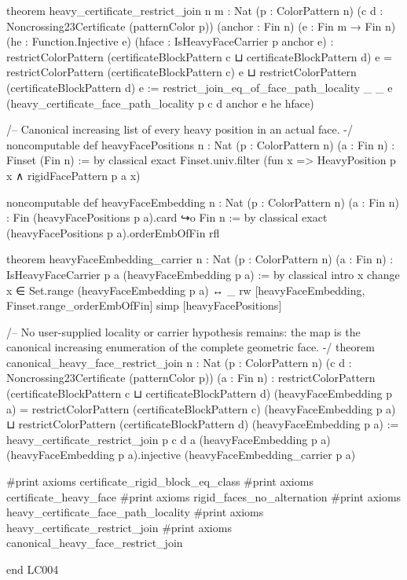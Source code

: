 \documentclass[11pt,reqno]{amsart}
\theoremstyle{definition}
\begin{document}
\begin{LeanCode}
theorem heavy_certificate_restrict_join {n m : Nat} (p : ColorPattern n)
    (c d : Noncrossing23Certificate (patternColor p))
    (anchor : Fin n) (e : Fin m → Fin n) (he : Function.Injective e)
    (hface : IsHeavyFaceCarrier p anchor e) :
    restrictColorPattern (certificateBlockPattern c ⊔ certificateBlockPattern d) e =
      restrictColorPattern (certificateBlockPattern c) e ⊔
        restrictColorPattern (certificateBlockPattern d) e :=
  restrict_join_eq_of_face_path_locality _ _ e
    (heavy_certificate_face_path_locality p c d anchor e he hface)

/-- Canonical increasing list of every heavy position in an actual face. -/
noncomputable def heavyFacePositions {n : Nat} (p : ColorPattern n) (a : Fin n) :
    Finset (Fin n) := by
  classical
  exact Finset.univ.filter (fun x => HeavyPosition p x ∧ rigidFacePattern p a x)

noncomputable def heavyFaceEmbedding {n : Nat} (p : ColorPattern n) (a : Fin n) :
    Fin (heavyFacePositions p a).card ↪o Fin n := by
  classical
  exact (heavyFacePositions p a).orderEmbOfFin rfl

theorem heavyFaceEmbedding_carrier {n : Nat} (p : ColorPattern n) (a : Fin n) :
    IsHeavyFaceCarrier p a (heavyFaceEmbedding p a) := by
  classical
  intro x
  change x ∈ Set.range (heavyFaceEmbedding p a) ↔ _
  rw [heavyFaceEmbedding, Finset.range_orderEmbOfFin]
  simp [heavyFacePositions]

/-- No user-supplied locality or carrier hypothesis remains: the map is
the canonical increasing enumeration of the complete geometric face. -/
theorem canonical_heavy_face_restrict_join {n : Nat} (p : ColorPattern n)
    (c d : Noncrossing23Certificate (patternColor p)) (a : Fin n) :
    restrictColorPattern (certificateBlockPattern c ⊔ certificateBlockPattern d)
        (heavyFaceEmbedding p a) =
      restrictColorPattern (certificateBlockPattern c) (heavyFaceEmbedding p a) ⊔
        restrictColorPattern (certificateBlockPattern d) (heavyFaceEmbedding p a) :=
  heavy_certificate_restrict_join p c d a (heavyFaceEmbedding p a)
    (heavyFaceEmbedding p a).injective (heavyFaceEmbedding_carrier p a)

#print axioms certificate_rigid_block_eq_class
#print axioms certificate_heavy_face
#print axioms rigid_faces_no_alternation
#print axioms heavy_certificate_face_path_locality
#print axioms heavy_certificate_restrict_join
#print axioms canonical_heavy_face_restrict_join

end LC004

\end{LeanCode}
\end{document}
